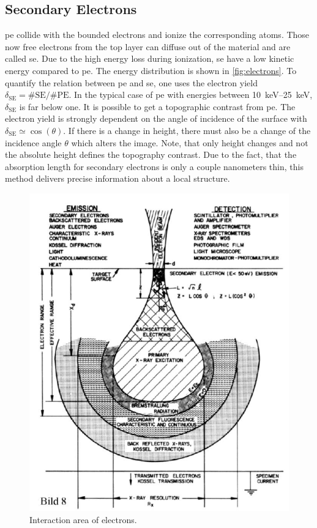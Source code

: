 \subsection{Secondary Electrons}
\ac{pe} collide with the bounded electrons and ionize the
corresponding atoms.
Those now free electrons from the top layer can diffuse out of the
material and are called \ac{se}.
Due to the high energy loss during ionization, \ac{se}
have a low kinetic energy compared to \ac{pe}.
The energy distribution is shown in \cref{fig:electrons}.
To quantify the relation between \ac{pe} and \ac{se}, one
uses the electron yield $\delta_\mathrm{SE} = \text{\# SE} / \text{\# PE}$.
In the typical case of \ac{pe} with energies between
\qtyrange{10}{25}{\kilo\electronvolt}, $\delta_\text{SE}$ is far below one.
It is possible to get a topographic contrast from \ac{pe}.
The electron yield is strongly dependent on the angle of incidence of
the surface with $\delta_\mathrm{SE} \simeq \cos(\theta)$.
If there is a change in height, there must also be a change of the
incidence angle $\theta$ which alters the image.
Note, that only height changes and not the absolute height defines the
topography contrast.
Due to the fact, that the absorption length for secondary electrons is
only a couple nanometers thin, this method delivers precise information
about a local structure.
\begin{figure}[H]
	\centering
	\includegraphics[width=0.95\linewidth]{../assets/birne.png}
	\caption{Interaction area of electrons. }
	\label{fig:birne}
\end{figure}
